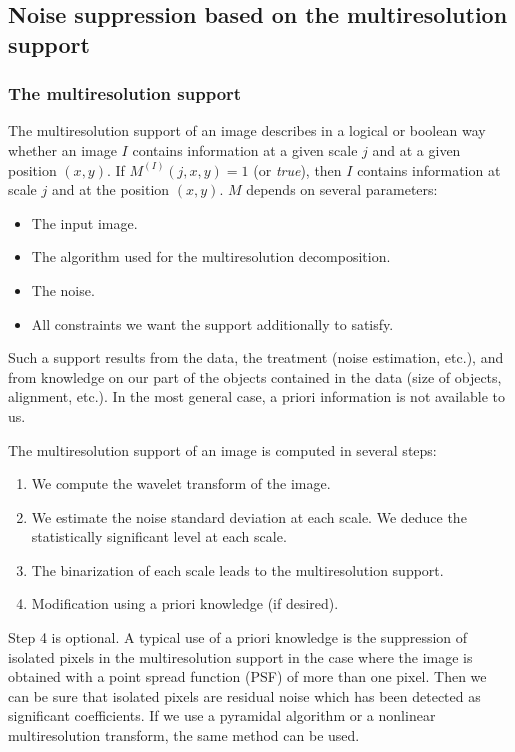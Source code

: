 \subsection{Noise suppression based on the multiresolution support}

\subsubsection{The multiresolution support}
The multiresolution 
support \cite{starck:sta95_1} of an image describes in a
logical or boolean way whether an image $I$ contains information at a 
given scale $j$ and at a given position $(x,y)$.
If $M^{(I)}(j,x,y) = 1$ (or {\it true}), then $I$ contains information at 
scale $j$ and at the position $(x,y)$.
$M$ depends on several parameters:
\begin{itemize}
\item The input image.
\item The algorithm used for the multiresolution decomposition.
\item The noise.
\item All constraints we want the support additionally to satisfy.
\end{itemize}
Such a support results from the data, the treatment (noise
estimation, etc.), and from knowledge on our part of the objects contained
in the data (size of objects, alignment, etc.). In the most general case, 
a priori information is not available to us.

The multiresolution support of an image is computed in several steps:
\begin{enumerate}
\item We compute the wavelet transform of the  image.
\item We estimate the noise standard deviation at each scale.  We
deduce the statistically significant level at each scale. 
\item The binarization of each scale leads to the multiresolution
support.
\item Modification using a priori knowledge (if desired).
\end{enumerate}
Step 4 is optional. A typical use of a priori knowledge is the
suppression of isolated pixels  in the multiresolution support in the 
case where the image is obtained with a point spread function (PSF) of
more than one pixel. Then we can be sure that isolated pixels are
residual noise which has been detected as significant coefficients.
 If we use a pyramidal algorithm or a nonlinear multiresolution transform, the same
method can be used.

